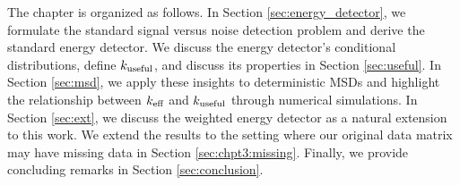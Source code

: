 The chapter is organized as follows. In Section \ref{sec:energy_detector}, we formulate
the standard signal versus noise detection problem and derive the standard energy
detector. We discuss the energy detector's conditional distributions, define $k_{\text{useful}}$, and
discuss its properties in Section \ref{sec:useful}. In Section \ref{sec:msd}, we apply
these insights to deterministic MSDs and highlight the relationship between $k_\text{eff}$ and
$k_{\text{useful}}$ through numerical simulations. In Section \ref{sec:ext}, we discuss the weighted
energy detector as a natural extension to this work.  We extend the results to the setting
where our original data matrix may have missing data in Section
\ref{sec:chpt3:missing}. Finally, we provide concluding remarks in Section
\ref{sec:conclusion}.
